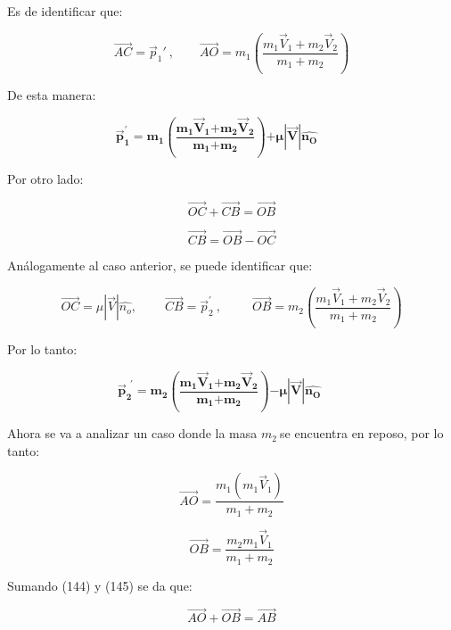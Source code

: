 \documentclass[]{article}
\begin{document}
Es de identificar que:

\[\overrightarrow{AC} = {\overrightarrow{p}}_{1}'\ ,\ \ \ \ \ \ \ \ \ \overrightarrow{AO} = m_{1}\left( \frac{m_{1}{\overrightarrow{V}}_{1} + m_{2}{\overrightarrow{V}}_{2}}{m_{1} + m_{2}} \right)\]

De esta manera:

\[{\overrightarrow{\mathbf{p}}}_{\mathbf{1}}^{\mathbf{'}}\mathbf{=}\mathbf{m}_{\mathbf{1}}\left( \frac{\mathbf{m}_{\mathbf{1}}{\overrightarrow{\mathbf{V}}}_{\mathbf{1}}\mathbf{+}\mathbf{m}_{\mathbf{2}}{\overrightarrow{\mathbf{V}}}_{\mathbf{2}}}{\mathbf{m}_{\mathbf{1}}\mathbf{+}\mathbf{m}_{\mathbf{2}}} \right)\mathbf{+ \mu}\left| \overrightarrow{\mathbf{V}} \right|\widehat{\mathbf{n}_{\mathbf{O}}}\mathbf{\ \ \ \ \ \ \ \ \ \ \ }\]

Por otro lado:

\[\overrightarrow{OC} + \overrightarrow{CB} = \overrightarrow{OB}\]

\[\overrightarrow{CB} = \overrightarrow{OB} - \overrightarrow{OC}\]

Análogamente al caso anterior, se puede identificar que:

\[\overrightarrow{OC} = \mu\left| \overrightarrow{V} \right|\widehat{n_{o}},\ \ \ \ \ \ \ \ \ \ \overrightarrow{CB} = {\overrightarrow{p}}_{2}^{'}\ ,\ \ \ \ \ \ \ \ \ \ \ \overrightarrow{OB} = m_{2}\left( \frac{m_{1}{\overrightarrow{V}}_{1} + m_{2}{\overrightarrow{V}}_{2}}{m_{1} + m_{2}} \right)\]

Por lo tanto:

\[{\overrightarrow{\mathbf{p}}}_{\mathbf{2}}^{\mathbf{\ \ '}}\mathbf{=}\mathbf{m}_{\mathbf{2}}\left( \frac{\mathbf{m}_{\mathbf{1}}{\overrightarrow{\mathbf{V}}}_{\mathbf{1}}\mathbf{+}\mathbf{m}_{\mathbf{2}}{\overrightarrow{\mathbf{V}}}_{\mathbf{2}}}{\mathbf{m}_{\mathbf{1}}\mathbf{+}\mathbf{m}_{\mathbf{2}}} \right)\mathbf{- \mu}\left| \overrightarrow{\mathbf{V}} \right|\widehat{\mathbf{n}_{\mathbf{O}}}\mathbf{\ \ \ \ \ \ \ \ \ }\]

Ahora se va a analizar un caso donde la masa \(m_{2}\ \)se encuentra en
reposo, por lo tanto:

\[\overrightarrow{AO} = \frac{m_{1}\left( m_{1}{\overrightarrow{V}}_{1} \right)}{m_{1} + m_{2}}\]

\[\overrightarrow{OB} = \frac{m_{2}m_{1}{\overrightarrow{V}}_{1}}{m_{1} + m_{2}}\]

Sumando (144) y (145) se da que:

\[\overrightarrow{AO} + \overrightarrow{OB} = \overrightarrow{AB}\]
\end{document}
